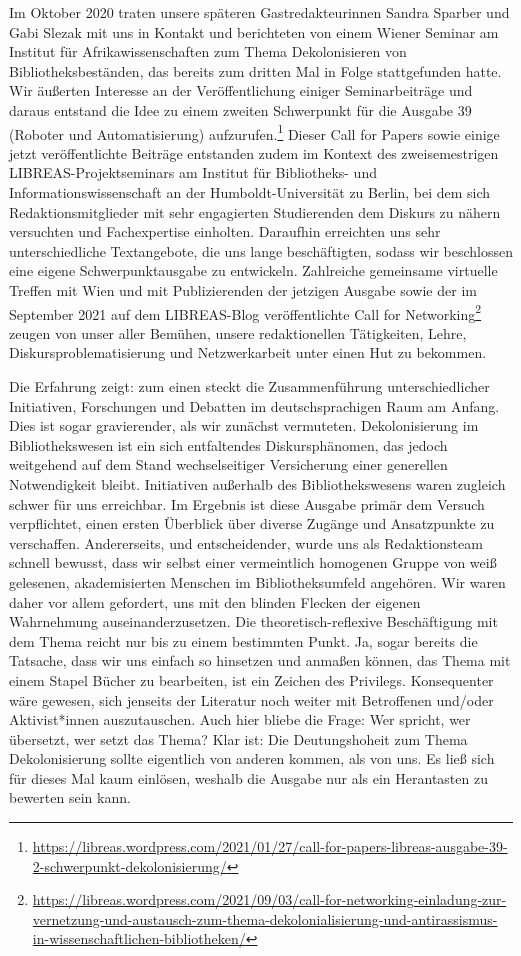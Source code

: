 \documentclass[a4paper,
fontsize=11pt,
oneside,
numbers=noperiodatend,
parskip=half-,
bibliography=totoc,
final
]{scrartcl}
\begin{document}
Im Oktober 2020 traten unsere späteren Gastredakteurinnen Sandra Sparber
und Gabi Slezak mit uns in Kontakt und berichteten von einem Wiener
Seminar am Institut für Afrikawissenschaften zum Thema Dekolonisieren
von Bibliotheksbeständen, das bereits zum dritten Mal in Folge
stattgefunden hatte. Wir äußerten Interesse an der Veröffentlichung
einiger Seminarbeiträge und daraus entstand die Idee zu einem zweiten
Schwerpunkt für die Ausgabe 39 (Roboter und Automatisierung)
aufzurufen.\footnote{\url{https://libreas.wordpress.com/2021/01/27/call-for-papers-libreas-ausgabe-39-2-schwerpunkt-dekolonisierung/}}
Dieser Call for Papers sowie einige jetzt veröffentlichte Beiträge
entstanden zudem im Kontext des zweisemestrigen LIBREAS-Projektseminars
am Institut für Bibliotheks- und Informationswissenschaft an der
Humboldt-Universität zu Berlin, bei dem sich Redaktionsmitglieder mit
sehr engagierten Studierenden dem Diskurs zu nähern versuchten und
Fachexpertise einholten. Daraufhin erreichten uns sehr unterschiedliche
Textangebote, die uns lange beschäftigten, sodass wir beschlossen eine
eigene Schwerpunktausgabe zu entwickeln. Zahlreiche gemeinsame virtuelle
Treffen mit Wien und mit Publizierenden der jetzigen Ausgabe sowie der
im September 2021 auf dem LIBREAS-Blog veröffentlichte Call for
Networking\footnote{\url{https://libreas.wordpress.com/2021/09/03/call-for-networking-einladung-zur-vernetzung-und-austausch-zum-thema-dekolonialisierung-und-antirassismus-in-wissenschaftlichen-bibliotheken/}}
zeugen von unser aller Bemühen, unsere redaktionellen Tätigkeiten,
Lehre, Diskursproblematisierung und Netzwerkarbeit unter einen Hut zu
bekommen.

Die Erfahrung zeigt: zum einen steckt die Zusammenführung
unterschiedlicher Initiativen, Forschungen und Debatten im
deutschsprachigen Raum am Anfang. Dies ist sogar gravierender, als wir
zunächst vermuteten. Dekolonisierung im Bibliothekswesen ist ein sich
entfaltendes Diskursphänomen, das jedoch weitgehend auf dem Stand
wechselseitiger Versicherung einer generellen Notwendigkeit bleibt.
Initiativen außerhalb des Bibliothekswesens waren zugleich schwer für
uns erreichbar. Im Ergebnis ist diese Ausgabe primär dem Versuch
verpflichtet, einen ersten Überblick über diverse Zugänge und
Ansatzpunkte zu verschaffen. Andererseits, und entscheidender, wurde uns
als Redaktionsteam schnell bewusst, dass wir selbst einer vermeintlich
homogenen Gruppe von weiß gelesenen, akademisierten Menschen im
Bibliotheksumfeld angehören. Wir waren daher vor allem gefordert, uns
mit den blinden Flecken der eigenen Wahrnehmung auseinanderzusetzen. Die
theoretisch-reflexive Beschäftigung mit dem Thema reicht nur bis zu
einem bestimmten Punkt. Ja, sogar bereits die Tatsache, dass wir uns
einfach so hinsetzen und anmaßen können, das Thema mit einem Stapel
Bücher zu bearbeiten, ist ein Zeichen des Privilegs. Konsequenter wäre
gewesen, sich jenseits der Literatur noch weiter mit Betroffenen
und/oder Aktivist*innen auszutauschen. Auch hier bliebe die Frage: Wer
spricht, wer übersetzt, wer setzt das Thema? Klar ist: Die
Deutungshoheit zum Thema Dekolonisierung sollte eigentlich von anderen
kommen, als von uns. Es ließ sich für dieses Mal kaum einlösen, weshalb
die Ausgabe nur als ein Herantasten zu bewerten sein kann.
\end{document}
